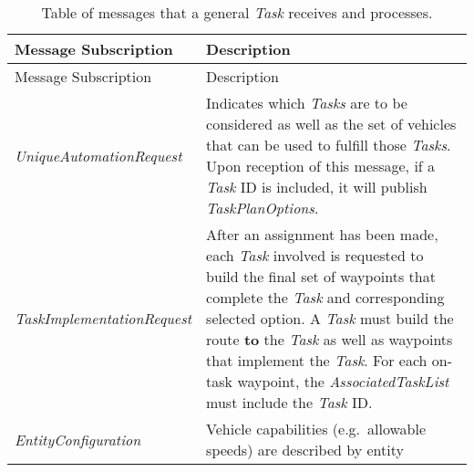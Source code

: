 \begin{longtable}[c]{@{}ll@{}}
\caption{Table of messages that a general \emph{Task} receives and
processes.}\tabularnewline
\toprule
\begin{minipage}[b]{0.29\columnwidth}\raggedright\strut
Message Subscription
\strut\end{minipage} &
\begin{minipage}[b]{0.65\columnwidth}\raggedright\strut
Description
\strut\end{minipage}\tabularnewline
\midrule
\endfirsthead
\toprule
\begin{minipage}[b]{0.29\columnwidth}\raggedright\strut
Message Subscription
\strut\end{minipage} &
\begin{minipage}[b]{0.65\columnwidth}\raggedright\strut
Description
\strut\end{minipage}\tabularnewline
\midrule
\endhead
\begin{minipage}[t]{0.29\columnwidth}\raggedright\strut
\emph{UniqueAutomationRequest}
\strut\end{minipage} &
\begin{minipage}[t]{0.65\columnwidth}\raggedright\strut
Indicates which \emph{Tasks} are to be considered as well as the set of
vehicles that can be used to fulfill those \emph{Tasks}. Upon reception
of this message, if a \emph{Task} ID is included, it will publish
\emph{TaskPlanOptions}.
\strut\end{minipage}\tabularnewline
\begin{minipage}[t]{0.29\columnwidth}\raggedright\strut
\emph{TaskImplementationRequest}
\strut\end{minipage} &
\begin{minipage}[t]{0.65\columnwidth}\raggedright\strut
After an assignment has been made, each \emph{Task} involved is
requested to build the final set of waypoints that complete the
\emph{Task} and corresponding selected option. A \emph{Task} must build
the route \textbf{to} the \emph{Task} as well as waypoints that
implement the \emph{Task}. For each on-task waypoint, the
\emph{AssociatedTaskList} must include the \emph{Task} ID.
\strut\end{minipage}\tabularnewline
\begin{minipage}[t]{0.29\columnwidth}\raggedright\strut
\emph{EntityConfiguration}
\strut\end{minipage} &
\begin{minipage}[t]{0.65\columnwidth}\raggedright\strut
Vehicle capabilities (e.g.~allowable speeds) are described by entity

\end{minipage}
\end{longtable}
